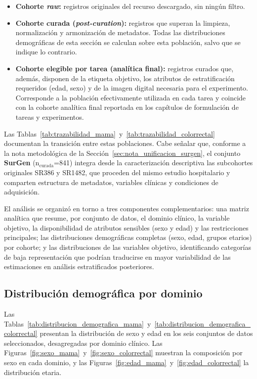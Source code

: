 \begin{itemize}
    \item \textbf{Cohorte \textit{raw}:} registros originales del recurso descargado, sin ningún filtro.
    \item \textbf{Cohorte curada (\textit{post-curation}):} registros que superan la limpieza, normalización y armonización de metadatos. Todas las distribuciones demográficas de esta sección se calculan sobre esta población, salvo que se indique lo contrario.
    \item \textbf{Cohorte elegible por tarea (analítica final):} registros curados que, además, disponen de la etiqueta objetivo, los atributos de estratificación requeridos (edad, sexo) y de la imagen digital necesaria para el experimento. Corresponde a la población efectivamente utilizada en cada tarea y coincide con la cohorte analítica final reportada en los capítulos de formulación de tareas y experimentos.
\end{itemize}

Las Tablas~\ref{tab:trazabilidad_mama}~y~\ref{tab:trazabilidad_colorrectal} documentan la transición entre estas poblaciones. Cabe señalar que, conforme a la nota metodológica de la Sección~\ref{sec:nota_unificacion_surgen}, el conjunto \textbf{SurGen} (n$_{\text{curada}}$=841) integra desde la caracterización descriptiva las subcohortes originales SR386 y SR1482, que proceden del mismo estudio hospitalario y comparten estructura de metadatos, variables clínicas y condiciones de adquisición.

El análisis se organizó en torno a tres componentes complementarios: una matriz analítica que resume, por conjunto de datos, el dominio clínico, la variable objetivo, la disponibilidad de atributos sensibles (sexo y edad) y las restricciones principales; las distribuciones demográficas completas (sexo, edad, grupos etarios) por cohorte; y las distribuciones de las variables objetivo, identificando categorías de baja representación que podrían traducirse en mayor variabilidad de las estimaciones en análisis estratificados posteriores.

\subsection{Distribución demográfica por dominio}

Las Tablas~\ref{tab:distribucion_demografica_mama}~y~\ref{tab:distribucion_demografica_colorrectal} presentan la distribución de sexo y edad en los seis conjuntos de datos seleccionados, desagregadas por dominio clínico. Las Figuras~\ref{fig:sexo_mama}~y~\ref{fig:sexo_colorrectal} muestran la composición por sexo en cada dominio, y las Figuras~\ref{fig:edad_mama}~y~\ref{fig:edad_colorrectal} la distribución etaria.


